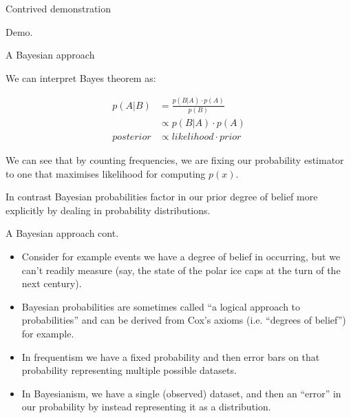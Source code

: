 \documentclass{beamer}
\begin{document}
\begin{frame}{Contrived demonstration}

  Demo.

\end{frame}

\begin{frame}{A Bayesian approach}

  We can interpret Bayes theorem as:

  \begin{align}
    p(A|B) &= \frac{p(B|A) \cdot p(A)}{p(B)} \nonumber \\
    &\propto p(B|A) \cdot p(A) \nonumber \\
    posterior &\propto likelihood \cdot prior \nonumber
  \end{align}

  We can see that by counting frequencies, we are fixing our
  probability estimator to one that maximises likelihood for computing
  $p(x)$.

  In contrast Bayesian probabilities factor in our prior degree of
  belief more explicitly by dealing in probability distributions.

\end{frame}

\begin{frame}{A Bayesian approach cont.}

  \begin{itemize}
    \item Consider for example events we have a degree of belief in
      occurring, but we can't readily measure (say, the state of the
      polar ice caps at the turn of the next century).
    \item Bayesian probabilities are sometimes called ``a logical
      approach to probabilities'' and can be derived from Cox's axioms
      (i.e. ``degrees of belief'') for example.
    \item In frequentism we have a fixed probability and then error
      bars on that probability representing multiple possible
      datasets.
    \item In Bayesianism, we have a single (observed) dataset, and
      then an ``error'' in our probability by instead representing it
      as a distribution.
  \end{itemize}

\end{frame}
\end{document}
